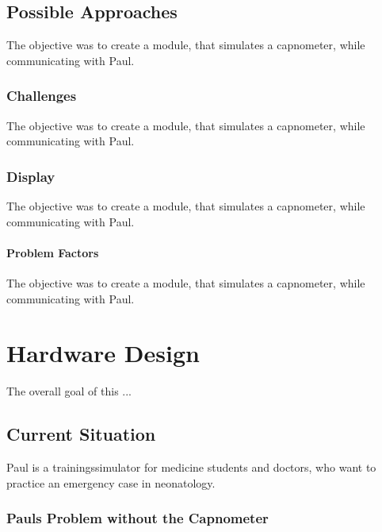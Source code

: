 \documentclass[12pt]{article}
\begin{document}
\subsection{Possible Approaches}

The objective was to create a module, that simulates a capnometer, while communicating
with Paul.


\subsubsection{Challenges}

The objective was to create a module, that simulates a capnometer, while communicating
with Paul.


\subsubsection{Display}

The objective was to create a module, that simulates a capnometer, while communicating
with Paul.


\paragraph{Problem Factors}

The objective was to create a module, that simulates a capnometer, while communicating
with Paul.


\clearpage



\section{Hardware Design}

The overall goal of this ...


\subsection{Current Situation}

Paul is a trainingssimulator for medicine students and doctors, who want to practice
an emergency case in neonatology.


\subsubsection{Pauls Problem without the Capnometer}
\end{document}
